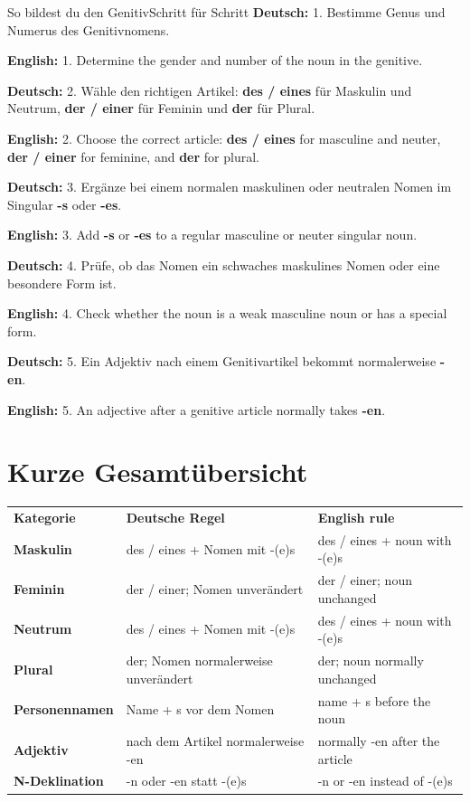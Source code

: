 \documentclass[a4paper,11pt]{article}
\newcommand{\GermanText}[1]{\textbf{Deutsch: }#1\par}
\newcommand{\EnglishText}[1]{{\small\color{SoftGray}\textbf{English: }#1\par}}
\begin{document}
        \begin{grammarentry}{So bildest du den Genitiv}{Schritt für Schritt}
            \GermanText{1. Bestimme Genus und Numerus des Genitivnomens.}
            \EnglishText{1. Determine the gender and number of the noun in the genitive.}

            \GermanText{2. Wähle den richtigen Artikel: \textbf{des / eines} für Maskulin und Neutrum, \textbf{der / einer} für Feminin und \textbf{der} für Plural.}
            \EnglishText{2. Choose the correct article: \textbf{des / eines} for masculine and neuter, \textbf{der / einer} for feminine, and \textbf{der} for plural.}

            \GermanText{3. Ergänze bei einem normalen maskulinen oder neutralen Nomen im Singular \textbf{-s} oder \textbf{-es}.}
            \EnglishText{3. Add \textbf{-s} or \textbf{-es} to a regular masculine or neuter singular noun.}

            \GermanText{4. Prüfe, ob das Nomen ein schwaches maskulines Nomen oder eine besondere Form ist.}
            \EnglishText{4. Check whether the noun is a weak masculine noun or has a special form.}

            \GermanText{5. Ein Adjektiv nach einem Genitivartikel bekommt normalerweise \textbf{-en}.}
            \EnglishText{5. An adjective after a genitive article normally takes \textbf{-en}.}
        \end{grammarentry}

    \section{Kurze Gesamtübersicht}

        \begin{longtable}{>{\bfseries}p{3.5cm}|p{5.2cm}|p{5.2cm}}
            \rowcolor{HeaderBlueDark}
            \color{white}\textbf{Kategorie} &
            \color{white}\textbf{Deutsche Regel} &
            \color{white}\textbf{English rule} \\
            Maskulin & des / eines + Nomen mit -(e)s & des / eines + noun with -(e)s \\
            Feminin & der / einer; Nomen unverändert & der / einer; noun unchanged \\
            Neutrum & des / eines + Nomen mit -(e)s & des / eines + noun with -(e)s \\
            Plural & der; Nomen normalerweise unverändert & der; noun normally unchanged \\
            Personennamen & Name + s vor dem Nomen & name + s before the noun \\
            Adjektiv & nach dem Artikel normalerweise -en & normally -en after the article \\
            N-Deklination & -n oder -en statt -(e)s & -n or -en instead of -(e)s \\
        \end{longtable}
\end{document}
